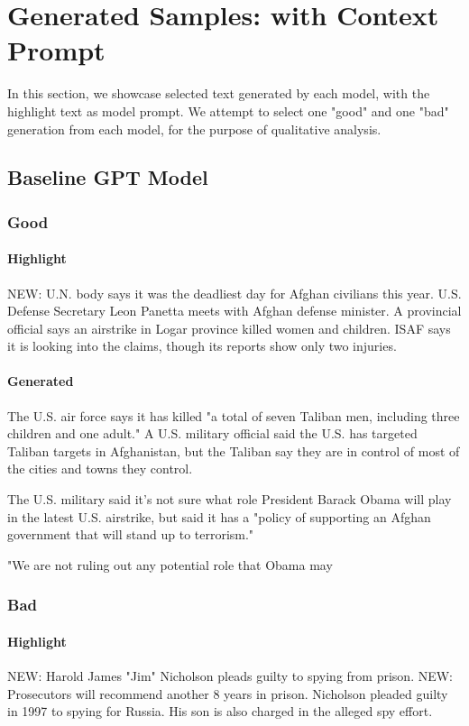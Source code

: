\documentclass{article}
\begin{document}
\section{Generated Samples: with Context Prompt}

In this section, we showcase selected text generated by each model, with the highlight text as model prompt. We attempt to select one "good" and one "bad" generation from each model, for the purpose of qualitative analysis.

\subsection{Baseline GPT Model}
\label{gpt-w}

\subsubsection{Good}

\paragraph{Highlight} 
NEW: U.N. body says it was the deadliest day for Afghan civilians this year. U.S. Defense Secretary Leon Panetta meets with Afghan defense minister. A provincial official says an airstrike in Logar province killed women and children. ISAF says it is looking into the claims, though its reports show only two injuries.

\paragraph{Generated} 
The U.S. air force says it has killed "a total of seven Taliban men, including three children and one adult." A U.S. military official said the U.S. has targeted Taliban targets in Afghanistan, but the Taliban say they are in control of most of the cities and towns they control.

The U.S. military said it's not sure what role President Barack Obama will play in the latest U.S. airstrike, but said it has a "policy of supporting an Afghan government that will stand up to terrorism."

"We are not ruling out any potential role that Obama may

\subsubsection{Bad}

\paragraph{Highlight}
NEW: Harold James "Jim" Nicholson pleads guilty to spying from prison. NEW: Prosecutors will recommend another 8 years in prison. Nicholson pleaded guilty in 1997 to spying for Russia. His son is also charged in the alleged spy effort.
\end{document}
